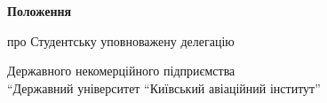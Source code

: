 \documentclass[12pt, a4paper]{extarticle}
\begin{document}
\begin{titlepage}
    \centering
    \vspace*{\fill}
    {\Huge\bfseries Положення}\par
    \vspace{1em}
    {\LARGE про Студентську уповноважену делегацію}\par
    \vspace{0.5em}
    {\large Державного некомерційного підприємства \\ ``Державний університет ``Київський авіаційний інститут''}\par
    \vspace*{\fill}
\end{titlepage}








\end{document}
